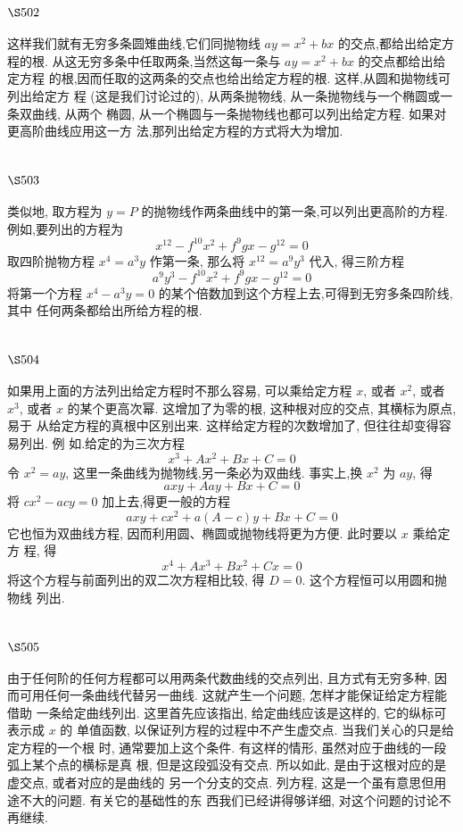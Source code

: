 \section{$\S 502$}

这样我们就有无穷多条圆雉曲线,它们同抛物线 $a y=x^{2}+b x$ 的交点,都给出给定方 程的根. 从这无穷多条中任取两条,当然这每一条与 $a y=x^{2}+b x$ 的交点都给出给定方程 的根,因而任取的这两条的交点也给出给定方程的根. 这样,从圆和拋物线可列出给定方 程 (这是我们讨论过的), 从两条抛物线, 从一条抛物线与一个椭圆或一条双曲线, 从两个 椭圆, 从一个椭圆与一条抛物线也都可以列出给定方程. 如果对更高阶曲线应用这一方 法,那列出给定方程的方式将大为增加.

\section{$\S 503$}

类似地, 取方程为 $y=P$ 的抛物线作两条曲线中的第一条,可以列出更高阶的方程. 例如,要列出的方程为
\[
x^{12}-f^{10} x^{2}+f^{9} g x-g^{12}=0
\]
取四阶抛物方程 $x^{4}=a^{3} y$ 作第一条, 那么将 $x^{12}=a^{9} y^{3}$ 代入, 得三阶方程
\[
a^{9} y^{3}-f^{10} x^{2}+f^{9} g x-g^{12}=0
\]
将第一个方程 $x^{4}-a^{3} y=0$ 的某个倍数加到这个方程上去,可得到无穷多条四阶线,其中 任何两条都给出所给方程的根.

\section{$\S 504$}

如果用上面的方法列出给定方程时不那么容易, 可以乘给定方程 $x$, 或者 $x^{2}$, 或者 $x^{3}$, 或者 $x$ 的某个更高次幂. 这增加了为零的根, 这种根对应的交点, 其横标为原点, 易于 从给定方程的真根中区别出来. 这样给定方程的次数增加了, 但往往却变得容易列出. 例 如.给定的为三次方程
\[
x^{3}+A x^{2}+B x+C=0
\]
令 $x^{2}=a y$, 这里一条曲线为抛物线,另一条必为双曲线. 事实上,换 $x^{2}$ 为 $a y$, 得
\[
a x y+A a y+B x+C=0
\]
将 $c x^{2}-a c y=0$ 加上去,得更一般的方程
\[
a x y+c x^{2}+a(A-c) y+B x+C=0
\]
它也恒为双曲线方程, 因而利用圆、椭圆或抛物线将更为方便. 此时要以 $x$ 乘给定方 程, 得
\[
x^{4}+A x^{3}+B x^{2}+C x=0
\]
将这个方程与前面列出的双二次方程相比较, 得 $D=0$. 这个方程恒可以用圆和抛物线 列出.

\section{$\S 505$}

由于任何阶的任何方程都可以用两条代数曲线的交点列出, 且方式有无穷多种, 因 而可用任何一条曲线代替另一曲线. 这就产生一个问题, 怎样才能保证给定方程能借助 一条给定曲线列出. 这里首先应该指出, 给定曲线应该是这样的, 它的纵标可表示成 $x$ 的 单值函数, 以保证列方程的过程中不产生虚交点. 当我们关心的只是给定方程的一个根 时, 通常要加上这个条件. 有这样的情形, 虽然对应于曲线的一段弧上某个点的横标是真 根, 但是这段弧没有交点. 所以如此, 是由于这根对应的是虚交点, 或者对应的是曲线的 另一个分支的交点. 列方程, 这是一个虽有意思但用途不大的问题. 有关它的基础性的东 西我们已经讲得够详细, 对这个问题的讨论不再继续.

